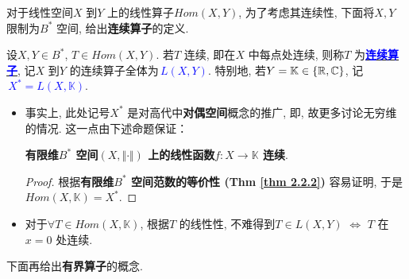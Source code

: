 	\vspace*{6em}
	
	对于线性空间$X$ 到$Y$ 上的线性算子$Hom(X , Y)$, 为了考虑其连续性, 下面将$X , Y$ 限制为$B^*$ 空间, 给出\textbf{连续算子}的定义. 
	
	\vspace*{1em}
	
	\begin{defn}\label{def 4.1.2}
		设$X , Y \in B^{*}$, $T \in Hom(X , Y)$. 若$T$ 连续, 即在$X$ 中每点处连续, 则称$T$ 为\underline{\textcolor{blue}{\textbf{连续算子}}}, 记$X$ 到$Y$ 的连续算子全体为\underline{\textcolor{blue}{\textbf{$\, L(X , Y)$}}}. 特别地, 若$Y = \mathbb{K} \in \{ \mathbb{R} , \mathbb{C} \}$, 记\underline{\textcolor{blue}{\textbf{$\, X^* = L(X , \mathbb{K})$}}}. 
		
		\vspace*{4em}
		
		\begin{rmk}
			\begin{itemize}
				\item 事实上, 此处记号$X^*$ 是对高代中\textbf{对偶空间}概念的推广, 即, 故更多讨论无穷维的情况. 这一点由下述命题保证：
				\begin{center}
					\textbf{有限维$B^*$ 空间$(X , \Vert \cdot \Vert)$ 上的线性函数$f : X \longrightarrow \mathbb{K}$ 连续}. 
				\end{center}
				
				\vspace*{1em}
				
				\begin{proof}
					根据\textbf{有限维$B^*$ 空间范数的等价性 (Thm \ref{thm 2.2.2})} 容易证明, 于是$Hom(X , \mathbb{K}) = X^*$.  
				\end{proof}
				
				\vspace*{6em}
				
				\item 对于$\forall T \in Hom(X , \mathbb{K})$, 根据$T$ 的线性性, 不难得到$T \in L(X , Y) \,\, \Leftrightarrow \,\, T$ 在$x = 0$ 处连续. 
			\end{itemize}
		\end{rmk}
	\end{defn}
	
	\newpage
	
	下面再给出\textbf{有界算子}的概念. 
	
	\vspace*{1em}
	
